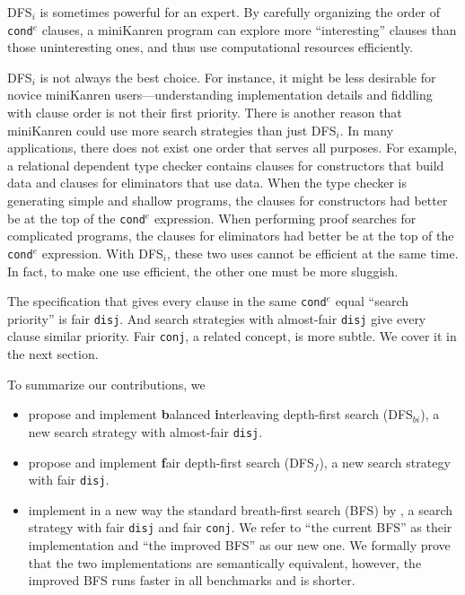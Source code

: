 \documentclass[format=acmlarge, review=true, authordraft=true]{acmart}
\newcommand{\conde}{\texttt{cond$^e$}}
\newcommand{\conj}{\texttt{conj}}
\newcommand{\disj}{\texttt{disj}}
\newcommand{\DFSi }[0]{DFS$_{i}$}
\newcommand{\DFSf }[0]{DFS$_{f}$}
\newcommand{\DFSbi}[0]{DFS$_{bi}$}
\newcommand{\BFS}[0]{BFS}
\newcommand{\BFSser}[0]{the current BFS}
\newcommand{\BFSimp}[0]{the improved BFS}
\begin{document}

\DFSi{} is sometimes powerful for an expert. By carefully organizing the order 
of \conde{} clauses, a miniKanren program can explore more ``interesting'' 
clauses than those uninteresting ones, and thus use computational resources 
efficiently.


\DFSi{} is not always the best choice. For instance, it might be less 
desirable for novice miniKanren users---understanding implementation details 
and fiddling with clause order is not their first priority. 
There is another reason that miniKanren could use more search strategies than
just \DFSi. In many applications, there does not exist one order that serves all
purposes. For example, a relational dependent type checker contains
clauses for constructors that build data and clauses for eliminators that use
data. When the type checker is generating simple and shallow programs,
the clauses for constructors had better be at the top of the
\conde{} expression.
When performing proof searches for complicated programs, the clauses for 
eliminators had better be at the top of the \conde{} expression. With \DFSi, 
these two uses cannot be efficient at the same time. In fact, to make one use 
efficient, the other one must be more sluggish.

The specification that gives every clause in the same \conde{} equal 
``search priority'' is fair \disj{}. And search strategies with 
almost-fair \disj{} give every clause similar priority. 
Fair \conj{}, a related concept, is more subtle. We cover it in the next 
section.

To summarize our contributions, we
\begin{itemize}
	\item propose and implement \textbf{b}alanced \textbf{i}nterleaving 
depth-first search (\DFSbi{}), a new search strategy with almost-fair \disj{}.
	\item propose and implement \textbf{f}air depth-first search (\DFSf{}), 
a new search strategy with fair \disj{}.
	\item implement in a new way the standard breath-first search (\BFS) by 
\citet{seres1999algebra}, a search strategy with fair \disj{} and fair \conj{}. 
We refer to ``\BFSser{}'' as their implementation and ``the improved 
BFS'' as our new one. We formally prove that the two implementations are 
semantically equivalent, however, \BFSimp{} runs faster in all benchmarks and 
is shorter.
\end{itemize}
\end{document}
